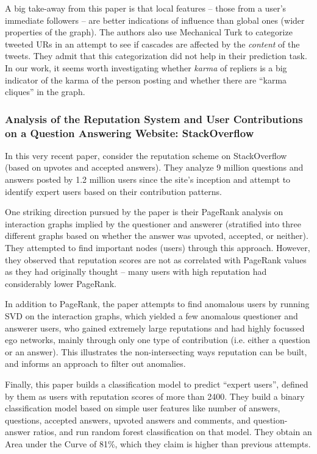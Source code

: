 \documentclass[10pt]{article}
\begin{document}
A big take-away from this paper is that local features -- those from a user's
immediate followers -- are better indications of influence than global ones
(wider properties of the graph). The authors also use Mechanical Turk to
categorize tweeted URs in an attempt to see if cascades are affected by the
\textit{content} of the tweets. They admit that this categorization did not help
in their prediction task. In our work, it seems worth investigating whether
\textit{karma} of repliers is a big indicator of the karma of the person posting
and whether there are ``karma cliques'' in the graph.

\subsubsection{Analysis of the Reputation System and User Contributions on a
  Question Answering Website: StackOverflow
  \citep{movshovitzanalysis}}

In this very recent paper, \citet{movshovitzanalysis} consider the reputation
scheme on StackOverflow (based on upvotes and accepted answers). They analyze 9
million questions and answers posted by 1.2 million users since the site's
inception and attempt to identify expert users based on their contribution
patterns.

One striking direction pursued by the paper is their PageRank analysis on
interaction graphs implied by the questioner and answerer (stratified into three
different graphs based on whether the answer was upvoted, accepted, or neither).
They attempted to find important nodes (users) through this approach. However,
they observed that reputation scores are not as correlated with PageRank values
as they had originally thought -- many users with high reputation had
considerably lower PageRank.

In addition to PageRank, the paper attempts to find anomalous users by running
SVD on the interaction graphs, which yielded a few anomalous questioner and
answerer users, who gained extremely large reputations and had highly focussed
ego networks, mainly through only one type of contribution (i.e. either a
question or an answer). This illustrates the non-intersecting ways reputation
can be built, and informs an approach to filter out anomalies.

Finally, this paper builds a classification model to predict ``expert users'',
defined by them as users with reputation scores of more than 2400. They build a
binary classification model based on simple user features like number of answers,
questions, accepted answers, upvoted answers and comments, and question-answer
ratios, and run random forest classification on that model. They obtain an Area
under the Curve of 81\%, which they claim is higher than previous attempts.
\end{document}

